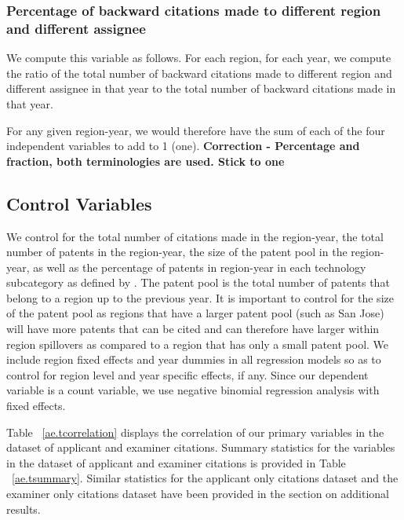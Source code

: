 \documentclass[12pt,letterpaper]{article}
\begin{document}
\subsubsection{Percentage of backward citations made to different region and different assignee}
We compute this variable as follows. For each region, for each year, we compute the ratio of the total number of backward citations made to different region and different assignee in that year to the total number of backward citations made in that year.\par

For any given region-year, we would therefore have the sum of each of the four independent variables to add to 1 (one). \textbf{Correction - Percentage and fraction, both terminologies are used. Stick to one}

\subsection{Control Variables}
We control for the total number of citations made in the region-year, the total number of patents in the region-year, the size of the patent pool in the region-year, as well as the percentage of patents in region-year in each technology subcategory as defined by \cite*{Hall2001a}. The patent pool is the total number of patents that belong to a region up to the previous year. It is important to control for the size of the patent pool as  regions that have a larger patent pool (such as San Jose) will have more patents that can be cited and can therefore have larger within region spillovers as compared to a region that has only a small patent pool. We include region fixed effects and year dummies in all regression models so as to control for region level and year specific effects, if any. Since our dependent variable is a count variable, we use negative binomial regression analysis with fixed effects. \par

Table ~\ref{ae.tcorrelation} displays the correlation of our primary variables in the dataset of applicant and examiner citations. Summary statistics for the variables in the dataset of applicant and examiner citations is provided in Table ~\ref{ae.tsummary}. Similar statistics for the applicant only citations dataset and the examiner only citations dataset have been provided in the section on additional results.

%
%
\end{document}
